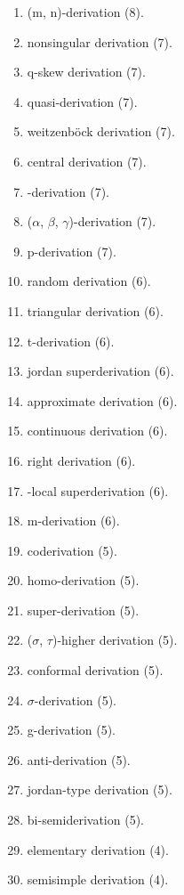 \begin{enumerate}
\item \allowbreak (m, n)-derivation \hfill(8).
\item \allowbreak nonsingular derivation \hfill(7).
\item \allowbreak q-skew derivation \hfill(7).
\item \allowbreak quasi-derivation \hfill(7).
\item \allowbreak weitzenb\"ock derivation \hfill(7).
\item \allowbreak central derivation \hfill(7).
\item {}-derivation \hfill(7).
\item \allowbreak ($\alpha$, $\beta$, $\gamma$)-derivation \hfill(7).
\item \allowbreak p-derivation \hfill(7).
\item \allowbreak random derivation \hfill(6).
\item \allowbreak triangular derivation \hfill(6).
\item \allowbreak t-derivation \hfill(6).
\item \allowbreak jordan superderivation \hfill(6).
\item \allowbreak approximate derivation \hfill(6).
\item \allowbreak continuous derivation \hfill(6).
\item \allowbreak right derivation \hfill(6).
\item {}-local superderivation \hfill(6).
\item \allowbreak m-derivation \hfill(6).
\item \allowbreak coderivation \hfill(5).
\item \allowbreak homo-derivation \hfill(5).
\item \allowbreak super-derivation \hfill(5).
\item \allowbreak ($\sigma$, $\tau$)-higher derivation \hfill(5).
\item \allowbreak conformal derivation \hfill(5).
\item \allowbreak $\sigma$-derivation \hfill(5).
\item \allowbreak g-derivation \hfill(5).
\item \allowbreak anti-derivation \hfill(5).
\item \allowbreak jordan-type derivation \hfill(5).
\item \allowbreak bi-semiderivation \hfill(5).
\item \allowbreak elementary derivation \hfill(4).
\item \allowbreak semisimple derivation \hfill(4).

\end{enumerate}

